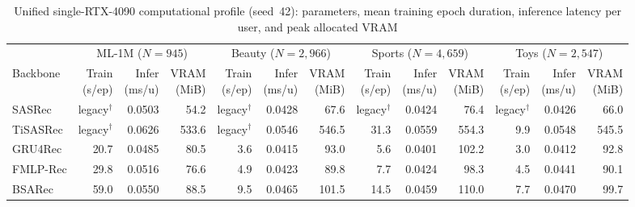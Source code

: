 \begin{table}[!htbp]
\centering
\caption{Unified single-RTX-4090 computational profile (seed~42): parameters, mean training epoch duration, inference latency per user, and peak allocated VRAM}
\label{tab:unified-costs}
\fontsize{7.8}{9.6}\selectfont
\setlength{\tabcolsep}{2.5pt}
\renewcommand{\arraystretch}{1.08}
\par\smallskip\noindent{}\par\smallskip
\noindent\begin{tabular*}{\textwidth}{@{\extracolsep{\fill}}lrrrrrrrrrrrr@{}}
\toprule
 & \multicolumn{3}{c}{ML-1M ($N{=}945$)} & \multicolumn{3}{c}{Beauty ($N{=}2{,}966$)} & \multicolumn{3}{c}{Sports ($N{=}4{,}659$)} & \multicolumn{3}{c}{Toys ($N{=}2{,}547$)} \\
\cmidrule(lr){2-4}\cmidrule(lr){5-7}\cmidrule(lr){8-10}\cmidrule(lr){11-13}
Backbone & \shortstack{Train\\(s/ep)} & \shortstack{Infer\\(ms/u)} & \shortstack{VRAM\\(MiB)} & \shortstack{Train\\(s/ep)} & \shortstack{Infer\\(ms/u)} & \shortstack{VRAM\\(MiB)} & \shortstack{Train\\(s/ep)} & \shortstack{Infer\\(ms/u)} & \shortstack{VRAM\\(MiB)} & \shortstack{Train\\(s/ep)} & \shortstack{Infer\\(ms/u)} & \shortstack{VRAM\\(MiB)} \\
\midrule
SASRec & legacy$^{\dagger}$ & 0.0503 & 54.2 & legacy$^{\dagger}$ & 0.0428 & 67.6 & legacy$^{\dagger}$ & 0.0424 & 76.4 & legacy$^{\dagger}$ & 0.0426 & 66.0 \\
TiSASRec & legacy$^{\dagger}$ & 0.0626 & 533.6 & legacy$^{\dagger}$ & 0.0546 & 546.5 & 31.3 & 0.0559 & 554.3 & 9.9 & 0.0548 & 545.5 \\
GRU4Rec & 20.7 & 0.0485 & 80.5 & 3.6 & 0.0415 & 93.0 & 5.6 & 0.0401 & 102.2 & 3.0 & 0.0412 & 92.8 \\
FMLP-Rec & 29.8 & 0.0516 & 76.6 & 4.9 & 0.0423 & 89.8 & 7.7 & 0.0424 & 98.3 & 4.5 & 0.0441 & 90.1 \\
BSARec & 59.0 & 0.0550 & 88.5 & 9.5 & 0.0465 & 101.5 & 14.5 & 0.0459 & 110.0 & 7.7 & 0.0470 & 99.7 \\

\end{tabular*}
\end{table}
